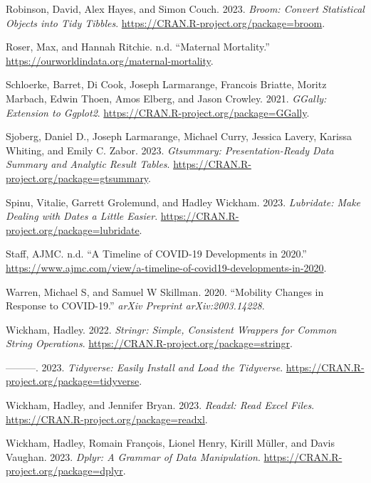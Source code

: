 \documentclass[
  letterpaper,
]{krantz}
\newlength{\cslhangindent}
\newenvironment{CSLReferences}[2] %
 {\begin{list}{}{%
  \setlength{\itemindent}{0pt}
  \setlength{\leftmargin}{0pt}
  \setlength{\parsep}{0pt}
  \ifodd #1
   \setlength{\leftmargin}{\cslhangindent}
   \setlength{\itemindent}{-1\cslhangindent}
  \fi
  \setlength{\itemsep}{#2\baselineskip}}}
 {\end{list}}
\begin{document}
\begin{CSLReferences}{1}{0}
Robinson, David, Alex Hayes, and Simon Couch. 2023. \emph{Broom: Convert
Statistical Objects into Tidy Tibbles}.
\url{https://CRAN.R-project.org/package=broom}.

Roser, Max, and Hannah Ritchie. n.d. {``Maternal Mortality.''}
\url{https://ourworldindata.org/maternal-mortality}.

Schloerke, Barret, Di Cook, Joseph Larmarange, Francois Briatte, Moritz
Marbach, Edwin Thoen, Amos Elberg, and Jason Crowley. 2021.
\emph{GGally: Extension to Ggplot2}.
\url{https://CRAN.R-project.org/package=GGally}.

Sjoberg, Daniel D., Joseph Larmarange, Michael Curry, Jessica Lavery,
Karissa Whiting, and Emily C. Zabor. 2023. \emph{Gtsummary:
Presentation-Ready Data Summary and Analytic Result Tables}.
\url{https://CRAN.R-project.org/package=gtsummary}.

Spinu, Vitalie, Garrett Grolemund, and Hadley Wickham. 2023.
\emph{Lubridate: Make Dealing with Dates a Little Easier}.
\url{https://CRAN.R-project.org/package=lubridate}.

Staff, AJMC. n.d. {``A Timeline of COVID-19 Developments in 2020.''}
\url{https://www.ajmc.com/view/a-timeline-of-covid19-developments-in-2020}.

Warren, Michael S, and Samuel W Skillman. 2020. {``Mobility Changes in
Response to COVID-19.''} \emph{arXiv Preprint arXiv:2003.14228}.

Wickham, Hadley. 2022. \emph{Stringr: Simple, Consistent Wrappers for
Common String Operations}.
\url{https://CRAN.R-project.org/package=stringr}.

---------. 2023. \emph{Tidyverse: Easily Install and Load the
Tidyverse}. \url{https://CRAN.R-project.org/package=tidyverse}.

Wickham, Hadley, and Jennifer Bryan. 2023. \emph{Readxl: Read Excel
Files}. \url{https://CRAN.R-project.org/package=readxl}.

Wickham, Hadley, Romain François, Lionel Henry, Kirill Müller, and Davis
Vaughan. 2023. \emph{Dplyr: A Grammar of Data Manipulation}.
\url{https://CRAN.R-project.org/package=dplyr}.


\end{CSLReferences}
\end{document}
